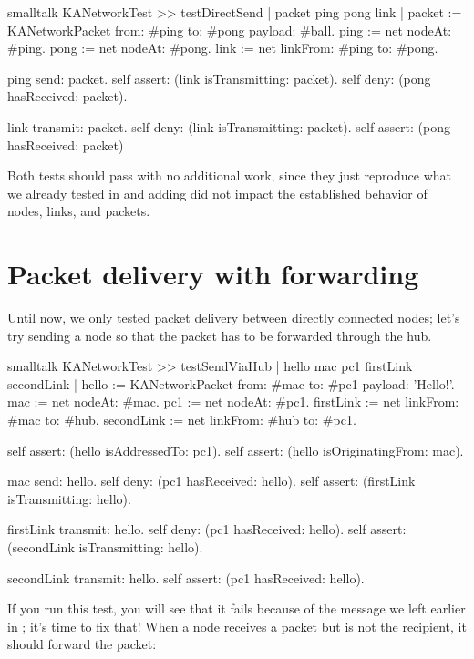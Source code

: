 \documentclass[10pt,twoside,english]{_support/latex/sbabook/sbabook}
\begin{document}
\begin{displaycode}{smalltalk}
KANetworkTest >> testDirectSend
    | packet ping pong link |
    packet := KANetworkPacket from: #ping to: #pong payload: #ball.
    ping := net nodeAt: #ping.
    pong := net nodeAt: #pong.
    link := net linkFrom: #ping to: #pong.

    ping send: packet.
    self assert: (link isTransmitting: packet).
    self deny: (pong hasReceived: packet).

    link transmit: packet.
    self deny: (link isTransmitting: packet).
    self assert: (pong hasReceived: packet)
\end{displaycode}

Both tests should pass with no additional work, since they just reproduce what we already tested in  and adding  did not impact the established behavior of nodes, links, and packets.
\section{Packet delivery with forwarding}
Until now, we only tested packet delivery between directly connected nodes; let's try sending a node so that the packet has to be forwarded through the hub.

\begin{displaycode}{smalltalk}
KANetworkTest >> testSendViaHub
    | hello mac pc1 firstLink secondLink |
    hello := KANetworkPacket from: #mac to: #pc1 payload: 'Hello!'.
    mac := net nodeAt: #mac.
    pc1 := net nodeAt: #pc1.
    firstLink := net linkFrom: #mac to: #hub.
    secondLink := net linkFrom: #hub to: #pc1.

    self assert: (hello isAddressedTo: pc1).
    self assert: (hello isOriginatingFrom: mac).

    mac send: hello.
    self deny: (pc1 hasReceived: hello).
    self assert: (firstLink isTransmitting: hello).

    firstLink transmit: hello.
    self deny: (pc1 hasReceived: hello).
    self assert: (secondLink isTransmitting: hello).

    secondLink transmit: hello.
    self assert: (pc1 hasReceived: hello).
\end{displaycode}

If you run this test, you will see that it fails because of the  message we left earlier in ; it's time to fix that!
When a node receives a packet but is not the recipient, it should forward the packet:
\end{document}

